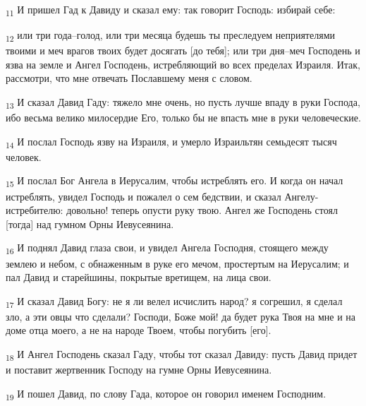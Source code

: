 \begin{tcolorbox}
\textsubscript{11} И пришел Гад к Давиду и сказал ему: так говорит Господь: избирай себе:
\end{tcolorbox}
\begin{tcolorbox}
\textsubscript{12} или три года--голод, или три месяца будешь ты преследуем неприятелями твоими и меч врагов твоих будет досягать [до тебя]; или три дня--меч Господень и язва на земле и Ангел Господень, истребляющий во всех пределах Израиля. Итак, рассмотри, что мне отвечать Пославшему меня с словом.
\end{tcolorbox}
\begin{tcolorbox}
\textsubscript{13} И сказал Давид Гаду: тяжело мне очень, но пусть лучше впаду в руки Господа, ибо весьма велико милосердие Его, только бы не впасть мне в руки человеческие.
\end{tcolorbox}
\begin{tcolorbox}
\textsubscript{14} И послал Господь язву на Израиля, и умерло Израильтян семьдесят тысяч человек.
\end{tcolorbox}
\begin{tcolorbox}
\textsubscript{15} И послал Бог Ангела в Иерусалим, чтобы истреблять его. И когда он начал истреблять, увидел Господь и пожалел о сем бедствии, и сказал Ангелу-истребителю: довольно! теперь опусти руку твою. Ангел же Господень стоял [тогда] над гумном Орны Иевусеянина.
\end{tcolorbox}
\begin{tcolorbox}
\textsubscript{16} И поднял Давид глаза свои, и увидел Ангела Господня, стоящего между землею и небом, с обнаженным в руке его мечом, простертым на Иерусалим; и пал Давид и старейшины, покрытые вретищем, на лица свои.
\end{tcolorbox}
\begin{tcolorbox}
\textsubscript{17} И сказал Давид Богу: не я ли велел исчислить народ? я согрешил, я сделал зло, а эти овцы что сделали? Господи, Боже мой! да будет рука Твоя на мне и на доме отца моего, а не на народе Твоем, чтобы погубить [его].
\end{tcolorbox}
\begin{tcolorbox}
\textsubscript{18} И Ангел Господень сказал Гаду, чтобы тот сказал Давиду: пусть Давид придет и поставит жертвенник Господу на гумне Орны Иевусеянина.
\end{tcolorbox}
\begin{tcolorbox}
\textsubscript{19} И пошел Давид, по слову Гада, которое он говорил именем Господним.
\end{tcolorbox}
